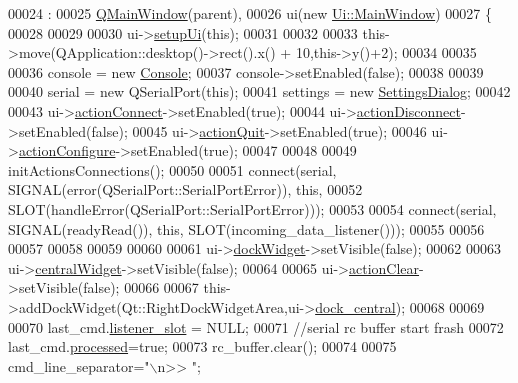 \begin{DoxyCode}
00024                                       :
00025     \hyperlink{a00010}{QMainWindow}(parent),
00026     ui(\textcolor{keyword}{new} \hyperlink{a00007}{Ui::MainWindow})
00027 \{
00028 
00029 
00030     ui->\hyperlink{a00027_acf4a0872c4c77d8f43a2ec66ed849b58}{setupUi}(\textcolor{keyword}{this});
00031 
00032 
00033     this->move(QApplication::desktop()->rect().x() + 10,this->y()+2);
00034 
00035 
00036         console = \textcolor{keyword}{new} \hyperlink{a00002}{Console};
00037         console->setEnabled(\textcolor{keyword}{false});
00038 
00039 
00040         serial = \textcolor{keyword}{new} QSerialPort(\textcolor{keyword}{this});
00041         settings = \textcolor{keyword}{new} \hyperlink{a00022}{SettingsDialog};
00042 
00043           ui->\hyperlink{a00027_aa0785566311fc48271690fb68b1d4c5f}{actionConnect}->setEnabled(\textcolor{keyword}{true});
00044           ui->\hyperlink{a00027_a8a16b3aef75b279eaaa887152d2f746b}{actionDisconnect}->setEnabled(\textcolor{keyword}{false});
00045           ui->\hyperlink{a00027_a188c243f36a2dbc10e4e2a0ad94273b1}{actionQuit}->setEnabled(\textcolor{keyword}{true});
00046           ui->\hyperlink{a00027_a3860abde3cfd3f6170e28fddde73f11e}{actionConfigure}->setEnabled(\textcolor{keyword}{true});
00047 
00048 
00049           initActionsConnections();
00050 
00051             connect(serial, SIGNAL(error(QSerialPort::SerialPortError)), \textcolor{keyword}{this},
00052             SLOT(handleError(QSerialPort::SerialPortError)));
00053 
00054             connect(serial, SIGNAL(readyRead()), \textcolor{keyword}{this}, SLOT(incoming\_data\_listener()));
00055 
00056 
00057 
00058 
00059 
00060 
00061            ui->\hyperlink{a00027_ac8a083c4b66fb317a9b538409ce412e2}{dockWidget}->setVisible(\textcolor{keyword}{false});
00062 
00063            ui->\hyperlink{a00027_a30075506c2116c3ed4ff25e07ae75f81}{centralWidget}->setVisible(\textcolor{keyword}{false});
00064 
00065            ui->\hyperlink{a00027_ac8539dcd87955047877cb256aff60453}{actionClear}->setVisible(\textcolor{keyword}{false});
00066 
00067           this->addDockWidget(Qt::RightDockWidgetArea,ui->\hyperlink{a00027_a19105d0d919fa33b5f29f7677bbab054}{dock\_central});
00068 
00069 
00070           last\_cmd.\hyperlink{a00001_abb76d8edb39876deb60975c8fd784b3f}{listener\_slot} = NULL;
00071           \textcolor{comment}{//serial rc buffer start frash}
00072           last\_cmd.\hyperlink{a00001_a3e88f779da9798a5da7dda227e2ca388}{processed}=\textcolor{keyword}{true};
00073           rc\_buffer.clear();
00074 
00075           cmd\_line\_separator=\textcolor{stringliteral}{"\(\backslash\)n>> "};

\end{DoxyCode}

